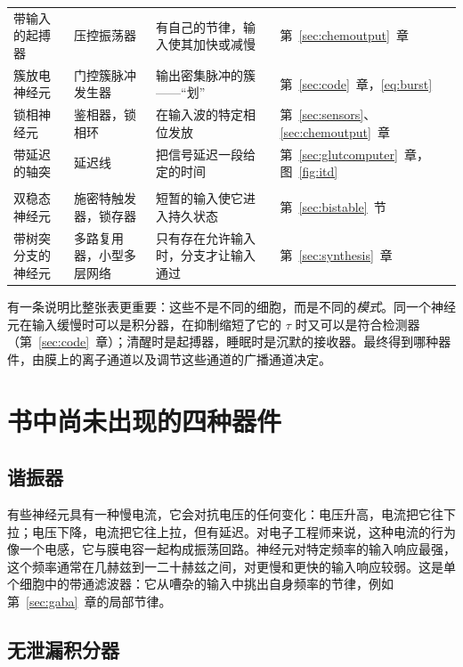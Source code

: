 \begin{center}
\begin{longtable}{>{\raggedright}p{3.1cm}>{\raggedright}p{3.3cm}>{\raggedright}p{4.7cm}>{\raggedright\arraybackslash}p{2.4cm}}
带输入的起搏器 & 压控振荡器 & 有自己的节律，输入使其加快或减慢 & 第~\ref{sec:chemoutput}~章 \\
簇放电神经元 & 门控簇脉冲发生器 & 输出密集脉冲的簇——“划” & 第~\ref{sec:code}~章，\eqref{eq:burst} \\
锁相神经元 & 鉴相器，锁相环 & 在输入波的特定相位发放 & 第~\ref{sec:sensors}、\ref{sec:chemoutput}~章 \\
带延迟的轴突 & 延迟线 & 把信号延迟一段给定的时间 & 第~\ref{sec:glutcomputer}~章，图~\ref{fig:itd} \\
\midrule
\multicolumn{4}{l}{\emph{存储与切换}} \\
双稳态神经元 & 施密特触发器，锁存器 & 短暂的输入使它进入持久状态 & 第~\ref{sec:bistable}~节 \\
带树突分支的神经元 & 多路复用器，小型多层网络 & 只有存在允许输入时，分支才让输入通过 & 第~\ref{sec:synthesis}~章 \\
\end{longtable}
\end{center}

有一条说明比整张表更重要：这些不是不同的细胞，而是不同的\emph{模式}。同一个神经元在输入缓慢时可以是积分器，在抑制缩短了它的 $\tau$ 时又可以是符合检测器（第~\ref{sec:code}~章）；清醒时是起搏器，睡眠时是沉默的接收器。最终得到哪种器件，由膜上的离子通道以及调节这些通道的广播通道决定。

\section{书中尚未出现的四种器件}

\subsection{谐振器}
\label{sec:resonator}

有些神经元具有一种慢电流，它会对抗电压的任何变化：电压升高，电流把它往下拉；电压下降，电流把它往上拉，但有延迟。对电子工程师来说，这种电流的行为像一个电感，它与膜电容一起构成振荡回路。神经元对特定频率的输入响应最强，这个频率通常在几赫兹到一二十赫兹之间，对更慢和更快的输入响应较弱\cite{HutcheonYarom2000}。这是单个细胞中的带通滤波器：它从嘈杂的输入中挑出自身频率的节律，例如第~\ref{sec:gaba}~章的局部节律。

\subsection{无泄漏积分器}
\label{sec:perfectint}

